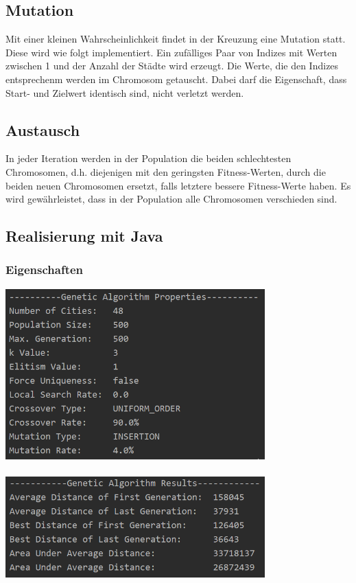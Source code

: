 \documentclass[11pt]{article}
\begin{document}
    \subsection{Mutation}
    Mit einer kleinen Wahrscheinlichkeit findet in der Kreuzung eine Mutation statt. Diese wird
    wie folgt implementiert. Ein zufälliges Paar von Indizes mit Werten zwischen 1 und der Anzahl
    der Städte wird erzeugt. Die Werte, die den Indizes entsprechenm werden im Chromosom getauscht.
    Dabei darf die Eigenschaft, dass Start- und Zielwert identisch sind, nicht verletzt werden.

    \subsection{Austausch}
    In jeder Iteration werden in der Population die beiden schlechtesten Chromosomen, d.h.
    diejenigen mit den geringsten Fitness-Werten, durch die beiden neuen Chromosomen ersetzt, falls
    letztere bessere Fitness-Werte haben. Es wird gewährleistet, dass in der Population alle
    Chromosomen verschieden sind.

    \subsection{Realisierung mit Java}

    \subsubsection{Eigenschaften}
    \begin{center}
        \includegraphics[width=10cm]{../../resources/properties_algorithm.png}
        \\~\\
        \includegraphics[width=10cm]{../../resources/properties_results.png}
    \end{center}
\end{document}
